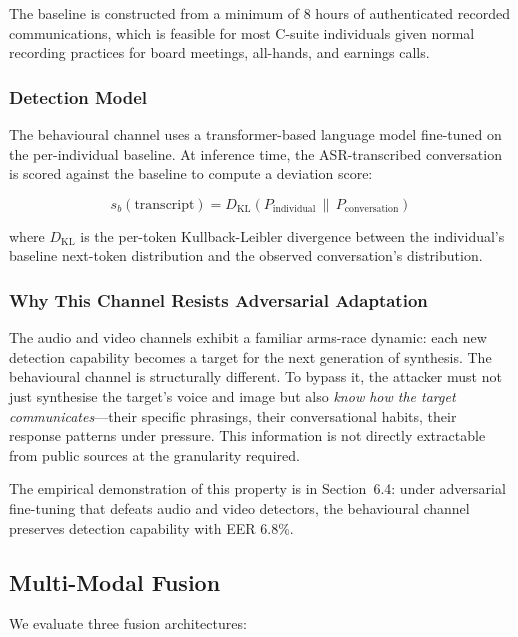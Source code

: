 \documentclass[sigconf,nonacm]{acmart}
\begin{document}
The baseline is constructed from a minimum of 8 hours of authenticated
recorded communications, which is feasible for most C-suite
individuals given normal recording practices for board meetings,
all-hands, and earnings calls.

\subsubsection{Detection Model}

The behavioural channel uses a transformer-based language model
fine-tuned on the per-individual baseline. At inference time, the
ASR-transcribed conversation is scored against the baseline to compute
a deviation score:

\begin{equation}
  s_b(\text{transcript}) = D_{\text{KL}}(P_{\text{individual}}
  \,\|\, P_{\text{conversation}})
\end{equation}

where $D_{\text{KL}}$ is the per-token Kullback-Leibler divergence
between the individual's baseline next-token distribution and the
observed conversation's distribution.

\subsubsection{Why This Channel Resists Adversarial Adaptation}

The audio and video channels exhibit a familiar arms-race dynamic:
each new detection capability becomes a target for the next
generation of synthesis. The behavioural channel is structurally
different. To bypass it, the attacker must not just synthesise the
target's voice and image but also \emph{know how the target
communicates}---their specific phrasings, their conversational habits,
their response patterns under pressure. This information is not
directly extractable from public sources at the granularity required.

The empirical demonstration of this property is in Section~6.4: under
adversarial fine-tuning that defeats audio and video detectors, the
behavioural channel preserves detection capability with EER 6.8\%.

\subsection{Multi-Modal Fusion}

We evaluate three fusion architectures:
\end{document}

